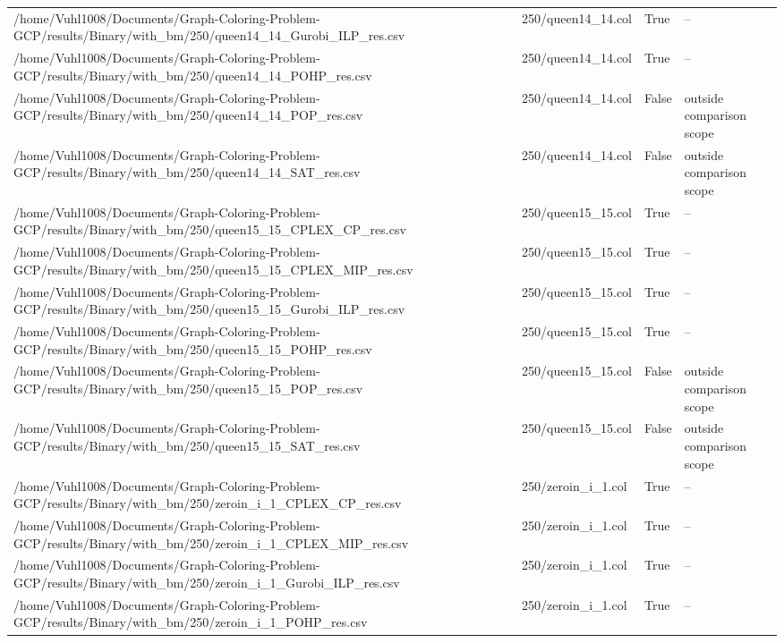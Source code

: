 \begin{table}[htbp]
\begin{tabular}{llll}
/home/Vuhl1008/Documents/Graph-Coloring-Problem-GCP/results/Binary/with\_bm/250/queen14\_14\_Gurobi\_ILP\_res.csv & 250/queen14\_14.col & True & -- \\
/home/Vuhl1008/Documents/Graph-Coloring-Problem-GCP/results/Binary/with\_bm/250/queen14\_14\_POHP\_res.csv & 250/queen14\_14.col & True & -- \\
/home/Vuhl1008/Documents/Graph-Coloring-Problem-GCP/results/Binary/with\_bm/250/queen14\_14\_POP\_res.csv & 250/queen14\_14.col & False & outside comparison scope \\
/home/Vuhl1008/Documents/Graph-Coloring-Problem-GCP/results/Binary/with\_bm/250/queen14\_14\_SAT\_res.csv & 250/queen14\_14.col & False & outside comparison scope \\
/home/Vuhl1008/Documents/Graph-Coloring-Problem-GCP/results/Binary/with\_bm/250/queen15\_15\_CPLEX\_CP\_res.csv & 250/queen15\_15.col & True & -- \\
/home/Vuhl1008/Documents/Graph-Coloring-Problem-GCP/results/Binary/with\_bm/250/queen15\_15\_CPLEX\_MIP\_res.csv & 250/queen15\_15.col & True & -- \\
/home/Vuhl1008/Documents/Graph-Coloring-Problem-GCP/results/Binary/with\_bm/250/queen15\_15\_Gurobi\_ILP\_res.csv & 250/queen15\_15.col & True & -- \\
/home/Vuhl1008/Documents/Graph-Coloring-Problem-GCP/results/Binary/with\_bm/250/queen15\_15\_POHP\_res.csv & 250/queen15\_15.col & True & -- \\
/home/Vuhl1008/Documents/Graph-Coloring-Problem-GCP/results/Binary/with\_bm/250/queen15\_15\_POP\_res.csv & 250/queen15\_15.col & False & outside comparison scope \\
/home/Vuhl1008/Documents/Graph-Coloring-Problem-GCP/results/Binary/with\_bm/250/queen15\_15\_SAT\_res.csv & 250/queen15\_15.col & False & outside comparison scope \\
/home/Vuhl1008/Documents/Graph-Coloring-Problem-GCP/results/Binary/with\_bm/250/zeroin\_i\_1\_CPLEX\_CP\_res.csv & 250/zeroin\_i\_1.col & True & -- \\
/home/Vuhl1008/Documents/Graph-Coloring-Problem-GCP/results/Binary/with\_bm/250/zeroin\_i\_1\_CPLEX\_MIP\_res.csv & 250/zeroin\_i\_1.col & True & -- \\
/home/Vuhl1008/Documents/Graph-Coloring-Problem-GCP/results/Binary/with\_bm/250/zeroin\_i\_1\_Gurobi\_ILP\_res.csv & 250/zeroin\_i\_1.col & True & -- \\
/home/Vuhl1008/Documents/Graph-Coloring-Problem-GCP/results/Binary/with\_bm/250/zeroin\_i\_1\_POHP\_res.csv & 250/zeroin\_i\_1.col & True & -- \\

\end{tabular}
\end{table}
